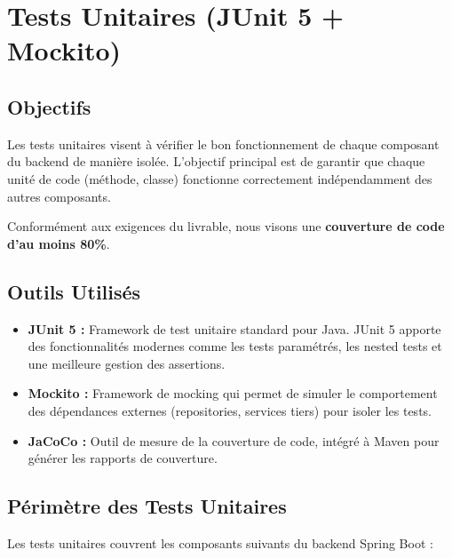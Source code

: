 \documentclass[12pt,a4paper]{report}
\begin{document}
\section{Tests Unitaires (JUnit 5 + Mockito)}

\subsection{Objectifs}

Les tests unitaires visent à vérifier le bon fonctionnement de chaque composant du backend de manière isolée. L'objectif principal est de garantir que chaque unité de code (méthode, classe) fonctionne correctement indépendamment des autres composants.

Conformément aux exigences du livrable, nous visons une \textbf{couverture de code d'au moins 80\%}.

\subsection{Outils Utilisés}

\begin{itemize}
    \item \textbf{JUnit 5 :} Framework de test unitaire standard pour Java. JUnit 5 apporte des fonctionnalités modernes comme les tests paramétrés, les nested tests et une meilleure gestion des assertions.
    
    \item \textbf{Mockito :} Framework de mocking qui permet de simuler le comportement des dépendances externes (repositories, services tiers) pour isoler les tests.

    
    \item \textbf{JaCoCo :} Outil de mesure de la couverture de code, intégré à Maven pour générer les rapports de couverture.
\end{itemize}

\subsection{Périmètre des Tests Unitaires}

Les tests unitaires couvrent les composants suivants du backend Spring Boot :
\end{document}
